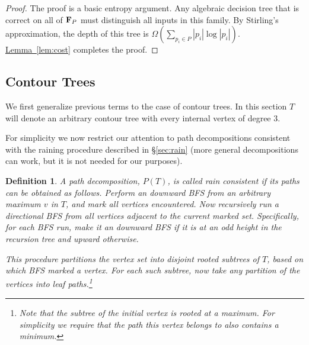 \documentclass[11pt]{article}
\newtheorem{definition}[theorem]{Definition}
\theoremstyle{definition}
\newcommand{\bF}{{\bf F}}
\newcommand{\cJ}{{\cal J}}
\newcommand{\Sec}[1]{\hyperref[sec:#1]{\S\ref*{sec:#1}}} %
\newcommand{\Lem}[1]{\hyperref[lem:#1]{Lemma~\ref*{lem:#1}}} %
\newcommand{\cost}{\mathop{cost}}
\newcommand{\jc}{\cJ_C}
\begin{document}
\begin{proof}
The proof is a basic entropy argument. Any algebraic decision tree that is correct on all of $\bF_P$
must distinguish all inputs in this family. By Stirling's approximation, the depth of this tree is $\Omega(\sum_{p_i\in P} |p_i|\log|p_i|)$.
\Lem{cost} completes the proof.
%
%
\end{proof}

\subsection{Contour Trees}
We first generalize previous terms to the case of contour trees.
In this section $T$ will denote an arbitrary contour tree with every internal vertex of degree $3$.

For simplicity we now restrict our attention to path decompositions 
consistent with the raining procedure described in \Sec{rain} 
(more general decompositions can work, but it is not needed for our purposes).

\begin{definition}
\label{def:path2} A path decomposition, $P(T)$, is called \emph{rain consistent} if its paths can be obtained as follows.
Perform an downward BFS from an arbitrary maximum $v$ in $T$, and mark all vertices encountered.  
Now recursively run a directional BFS from all vertices adjacent to the current marked set.  
Specifically, for each BFS run, make it an downward BFS if it is at an odd height in the recursion tree and upward otherwise.  

This procedure partitions the vertex set into disjoint rooted subtrees of $T$, based on which BFS marked a vertex.  
For each such subtree, now take any partition of the vertices into leaf paths.\footnote{Note that the subtree  
of the initial vertex is rooted at a maximum.  For simplicity we require that the path this vertex belongs to 
also contains a minimum.}
\end{definition}
\end{document}
